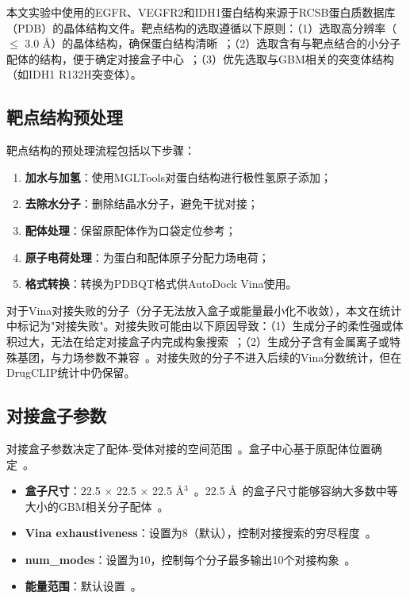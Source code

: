 本文实验中使用的EGFR、VEGFR2和IDH1蛋白结构来源于RCSB蛋白质数据库（PDB）的晶体结构文件。靶点结构的选取遵循以下原则：（1）选取高分辨率（$\le$ 3.0 \AA）的晶体结构，确保蛋白结构清晰~\cite{Trott2010}；（2）选取含有与靶点结合的小分子配体的结构，便于确定对接盒子中心~\cite{Trott2010}；（3）优先选取与GBM相关的突变体结构（如IDH1 R132H突变体）。

\subsection{靶点结构预处理}\label{sec:protein-prep}

靶点结构的预处理流程包括以下步骤：

\begin{enumerate}
    \item \textbf{加水与加氢}：使用MGLTools对蛋白结构进行极性氢原子添加；
    \item \textbf{去除水分子}：删除结晶水分子，避免干扰对接；
    \item \textbf{配体处理}：保留原配体作为口袋定位参考；
    \item \textbf{原子电荷处理}：为蛋白和配体原子分配力场电荷；
    \item \textbf{格式转换}：转换为PDBQT格式供AutoDock Vina使用。
\end{enumerate}

对于Vina对接失败的分子（分子无法放入盒子或能量最小化不收敛），本文在统计中标记为"对接失败"。对接失败可能由以下原因导致：（1）生成分子的柔性强或体积过大，无法在给定对接盒子内完成构象搜索~\cite{Trott2010}；（2）生成分子含有金属离子或特殊基团，与力场参数不兼容~\cite{Trott2010}。对接失败的分子不进入后续的Vina分数统计，但在DrugCLIP统计中仍保留。

\subsection{对接盒子参数}\label{sec:docking-box}

对接盒子参数决定了配体-受体对接的空间范围~\cite{Trott2010}。盒子中心基于原配体位置确定~\cite{Trott2010}。

\begin{itemize}
    \item \textbf{盒子尺寸}：22.5 $\times$ 22.5 $\times$ 22.5 \AA$^3$~\cite{Trott2010}。22.5 \AA\ 的盒子尺寸能够容纳大多数中等大小的GBM相关分子配体~\cite{Trott2010}。
    \item \textbf{Vina exhaustiveness}：设置为8（默认），控制对接搜索的穷尽程度~\cite{Trott2010}。
    \item \textbf{num\_modes}：设置为10，控制每个分子最多输出10个对接构象~\cite{Trott2010}。
    \item \textbf{能量范围}：默认设置~\cite{Trott2010}。
\end{itemize}

